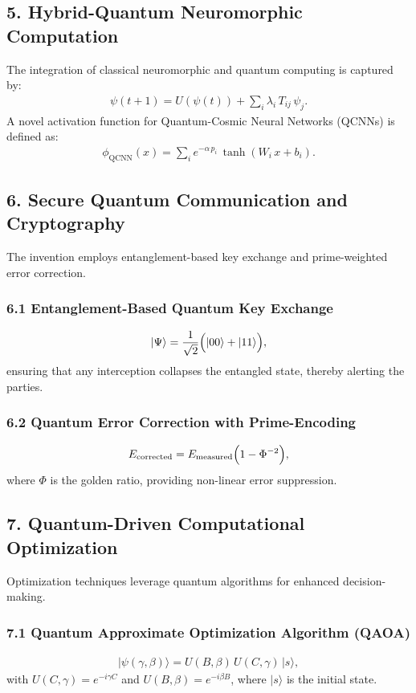 \documentclass[12pt]{article}
\begin{document}
\subsection*{5. Hybrid-Quantum Neuromorphic Computation}
The integration of classical neuromorphic and quantum computing is captured by:
\begin{align}
\psi(t+1) = U(\psi(t)) + \sum_{i} \lambda_i\, T_{ij}\, \psi_j.
\end{align}
A novel activation function for Quantum-Cosmic Neural Networks (QCNNs) is defined as:
\begin{align}
\phi_{\text{QCNN}}(x) = \sum_{i} e^{-\alpha\, p_i}\, \tanh(W_i\, x + b_i).
\end{align}

\subsection*{6. Secure Quantum Communication and Cryptography}
The invention employs entanglement-based key exchange and prime-weighted error correction.

\subsubsection*{6.1 Entanglement-Based Quantum Key Exchange}
\begin{align}
|\Psi\rangle = \frac{1}{\sqrt{2}} \Bigl(|00\rangle + |11\rangle\Bigr),
\end{align}
ensuring that any interception collapses the entangled state, thereby alerting the parties.

\subsubsection*{6.2 Quantum Error Correction with Prime-Encoding}
\begin{align}
E_{\text{corrected}} = E_{\text{measured}}\Bigl(1-\Phi^{-2}\Bigr),
\end{align}
where $\Phi$ is the golden ratio, providing non-linear error suppression.

\subsection*{7. Quantum-Driven Computational Optimization}
Optimization techniques leverage quantum algorithms for enhanced decision-making.

\subsubsection*{7.1 Quantum Approximate Optimization Algorithm (QAOA)}
\begin{align}
|\psi(\gamma,\beta)\rangle = U(B,\beta)\, U(C,\gamma)\, |s\rangle,
\end{align}
with $U(C,\gamma)=e^{-i\gamma C}$ and $U(B,\beta)=e^{-i\beta B}$, where $|s\rangle$ is the initial state.
\end{document}
